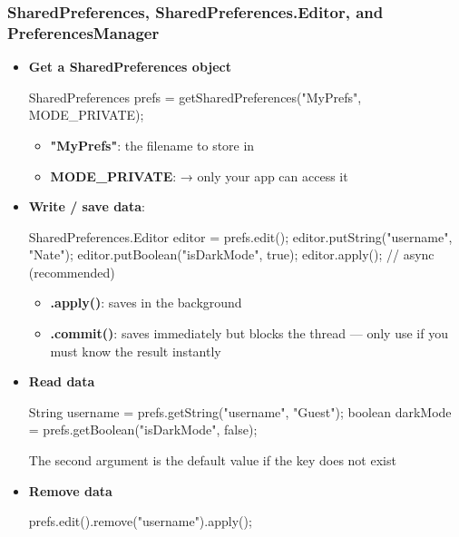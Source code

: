 \documentclass{report}
\begin{document}
    \subsubsection{SharedPreferences, SharedPreferences.Editor, and PreferencesManager}
    \begin{itemize}
        \item \textbf{Get a SharedPreferences object}
            \bigbreak \noindent 
            \begin{javacode}
                SharedPreferences prefs = getSharedPreferences("MyPrefs", MODE_PRIVATE);
            \end{javacode}
            \begin{itemize}
                \item \textbf{"MyPrefs"}: the filename to store in
                \item \textbf{MODE\_PRIVATE}: → only your app can access it
            \end{itemize}
        \item \textbf{Write / save data}:
            \bigbreak \noindent 
            \begin{javacode}
                SharedPreferences.Editor editor = prefs.edit();
                editor.putString("username", "Nate");
                editor.putBoolean("isDarkMode", true);
                editor.apply(); // async (recommended)
            \end{javacode}
            \begin{itemize}
                \item \textbf{.apply()}: saves in the background
                \item \textbf{.commit()}: saves immediately but blocks the thread — only use if you must know the result instantly
            \end{itemize}
        \item \textbf{Read data}
            \bigbreak \noindent 
            \begin{javacode}
                String username = prefs.getString("username", "Guest");
                boolean darkMode = prefs.getBoolean("isDarkMode", false);
            \end{javacode}
            \bigbreak \noindent 
            The second argument is the default value if the key does not exist
        \item \textbf{Remove data}
            \bigbreak \noindent 
            \begin{javacode}
                prefs.edit().remove("username").apply();

\end{javacode}
\end{itemize}
\end{document}
